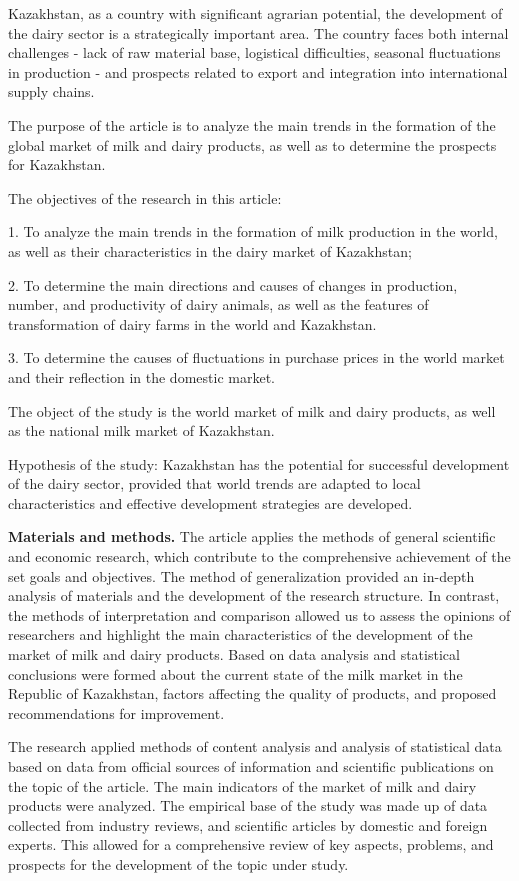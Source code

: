 Kazakhstan, as a country with significant agrarian potential, the
development of the dairy sector is a strategically important area. The
country faces both internal challenges - lack of raw material base,
logistical difficulties, seasonal fluctuations in production - and
prospects related to export and integration into international supply
chains.

The purpose of the article is to analyze the main trends in the
formation of the global market of milk and dairy products, as well as to
determine the prospects for Kazakhstan.

The objectives of the research in this article:

1. To analyze the main trends in the formation of milk production in the
world, as well as their characteristics in the dairy market of
Kazakhstan;

2. To determine the main directions and causes of changes in production,
number, and productivity of dairy animals, as well as the features of
transformation of dairy farms in the world and Kazakhstan.

3. To determine the causes of fluctuations in purchase prices in the
world market and their reflection in the domestic market.

The object of the study is the world market of milk and dairy products,
as well as the national milk market of Kazakhstan.

Hypothesis of the study: Kazakhstan has the potential for successful
development of the dairy sector, provided that world trends are adapted
to local characteristics and effective development strategies are
developed.

{\bfseries Materials and methods.} The article applies the methods of
general scientific and economic research, which contribute to the
comprehensive achievement of the set goals and objectives. The method of
generalization provided an in-depth analysis of materials and the
development of the research structure. In contrast, the methods of
interpretation and comparison allowed us to assess the opinions of
researchers and highlight the main characteristics of the development of
the market of milk and dairy products. Based on data analysis and
statistical conclusions were formed about the current state of the milk
market in the Republic of Kazakhstan, factors affecting the quality of
products, and proposed recommendations for improvement.

The research applied methods of content analysis and analysis of
statistical data based on data from official sources of information and
scientific publications on the topic of the article. The main indicators
of the market of milk and dairy products were analyzed. The empirical
base of the study was made up of data collected from industry reviews,
and scientific articles by domestic and foreign experts. This allowed
for a comprehensive review of key aspects, problems, and prospects for
the development of the topic under study.

